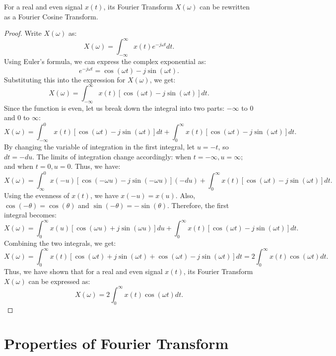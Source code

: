 \begin{proposition}
For a real and even signal $x(t)$, its Fourier Transform $X(\omega)$ can be rewritten as a Fourier Cosine Transform.
\end{proposition}
\begin{proof}
Write $X(\omega)$ as:
\[
X(\omega) = \int_{-\infty}^{\infty} x(t) e^{-j \omega t} dt.
\]
Using Euler's formula, we can express the complex exponential as:
\[
e^{-j \omega t} = \cos(\omega t) - j \sin(\omega t).
\]
Substituting this into the expression for $X(\omega)$, we get:
\[
X(\omega) = \int_{-\infty}^{\infty} x(t) [\cos(\omega t) - j \sin(\omega t)] dt.
\]
Since the function is even, let us break down the integral into two parts: $-\infty$ to $0$ and $0$ to $\infty$:
\[
X(\omega) = \int_{-\infty}^{0} x(t) [\cos(\omega t) - j \sin(\omega t)] dt + \int_{0}^{\infty} x(t) [\cos(\omega t) - j \sin(\omega t)] dt.
\]
By changing the variable of integration in the first integral, let $u = -t$, so $dt = -du$. The limits of integration change accordingly: when $t = -\infty, u = \infty;$ and when $t = 0, u = 0$. Thus, we have:
\[
X(\omega) = \int_{\infty}^{0} x(-u) [\cos(-\omega u) - j \sin(-\omega u)] (-du) + \int_{0}^{\infty} x(t) [\cos(\omega t) - j \sin(\omega t)] dt.
\]
Using the evenness of $x(t)$, we have $x(-u) = x(u)$. Also, $\cos(-\theta) = \cos(\theta)$ and $\sin(-\theta) = -\sin(\theta)$. Therefore, the first integral becomes:
\[
X(\omega) = \int_{0}^{\infty} x(u) [\cos(\omega u) + j \sin(\omega u)] du + \int_{0}^{\infty} x(t) [\cos(\omega t) - j \sin(\omega t)] dt.
\]
Combining the two integrals, we get:
\[
X(\omega) = \int_{0}^{\infty} x(t) [\cos(\omega t) + j \sin(\omega t) + \cos(\omega t) - j \sin(\omega t)] dt = 2 \int_{0}^{\infty} x(t) \cos(\omega t) dt.
\]
Thus, we have shown that for a real and even signal $x(t)$, its Fourier Transform $X(\omega)$ can be expressed as:
\[
X(\omega) = 2 \int_{0}^{\infty} x(t) \cos(\omega t) dt.
\]
\end{proof}
\section{Properties of Fourier Transform}
